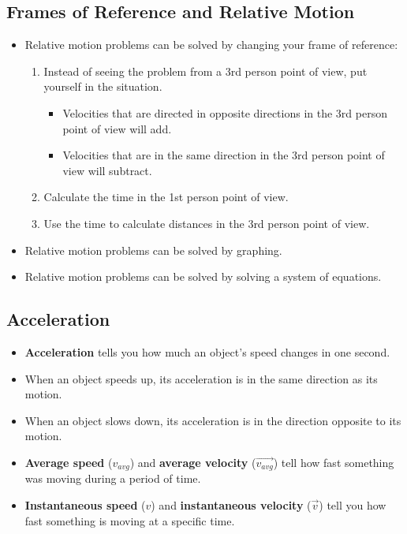 \documentclass[letterpaper, 12pt]{article}
\begin{document}
\subsection*{Frames of Reference and Relative Motion}
\begin{itemize}
	\item Relative motion problems can be solved by changing your frame of reference:
		\begin{enumerate} 
			\item Instead of seeing the problem from a 3rd person point of view, put yourself in the situation.
				\begin{itemize}
					\item Velocities that are directed in opposite directions in the 3rd person point of view will add.
					\item Velocities that are in the same direction in the 3rd person point of view will subtract.
				\end{itemize}
			\item Calculate the time in the 1st person point of view.
			\item Use the time to calculate distances in the 3rd person point of view.
			
		\end{enumerate}
	\item Relative motion problems can be solved by graphing.
	\item Relative motion problems can be solved by solving a system of equations.
	
	
\end{itemize}

	
\subsection*{Acceleration}
\begin{itemize}
	\item \textbf{Acceleration} tells you how much an object's speed changes in one second.
	\item When an object speeds up, its acceleration is in the same direction as its motion.
	\item When an object slows down, its acceleration is in the direction  opposite to its motion.
	\item \textbf{Average speed} ($v_{avg}$) and \textbf{average velocity} ($\vec{v_{avg}}$) tell how fast something was moving during a period of time.
	\item \textbf{Instantaneous speed} ($v$) and \textbf{instantaneous velocity} ($\vec{v}$) tell you how fast something is moving at a specific time.
	
\end{itemize}
\end{document}
